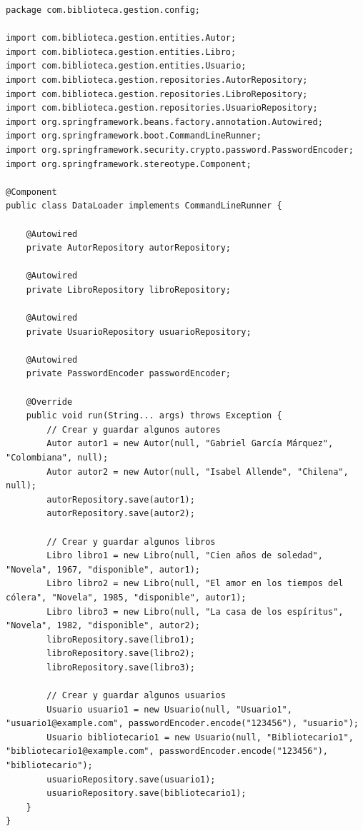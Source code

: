 \documentclass[11pt]{article}
\begin{document}
\begin{verbatim}
package com.biblioteca.gestion.config;

import com.biblioteca.gestion.entities.Autor;
import com.biblioteca.gestion.entities.Libro;
import com.biblioteca.gestion.entities.Usuario;
import com.biblioteca.gestion.repositories.AutorRepository;
import com.biblioteca.gestion.repositories.LibroRepository;
import com.biblioteca.gestion.repositories.UsuarioRepository;
import org.springframework.beans.factory.annotation.Autowired;
import org.springframework.boot.CommandLineRunner;
import org.springframework.security.crypto.password.PasswordEncoder;
import org.springframework.stereotype.Component;

@Component
public class DataLoader implements CommandLineRunner {

    @Autowired
    private AutorRepository autorRepository;

    @Autowired
    private LibroRepository libroRepository;

    @Autowired
    private UsuarioRepository usuarioRepository;

    @Autowired
    private PasswordEncoder passwordEncoder;

    @Override
    public void run(String... args) throws Exception {
        // Crear y guardar algunos autores
        Autor autor1 = new Autor(null, "Gabriel García Márquez", "Colombiana", null);
        Autor autor2 = new Autor(null, "Isabel Allende", "Chilena", null);
        autorRepository.save(autor1);
        autorRepository.save(autor2);

        // Crear y guardar algunos libros
        Libro libro1 = new Libro(null, "Cien años de soledad", "Novela", 1967, "disponible", autor1);
        Libro libro2 = new Libro(null, "El amor en los tiempos del cólera", "Novela", 1985, "disponible", autor1);
        Libro libro3 = new Libro(null, "La casa de los espíritus", "Novela", 1982, "disponible", autor2);
        libroRepository.save(libro1);
        libroRepository.save(libro2);
        libroRepository.save(libro3);

        // Crear y guardar algunos usuarios
        Usuario usuario1 = new Usuario(null, "Usuario1", "usuario1@example.com", passwordEncoder.encode("123456"), "usuario");
        Usuario bibliotecario1 = new Usuario(null, "Bibliotecario1", "bibliotecario1@example.com", passwordEncoder.encode("123456"), "bibliotecario");
        usuarioRepository.save(usuario1);
        usuarioRepository.save(bibliotecario1);
    }
}
\end{verbatim}
\end{document}
